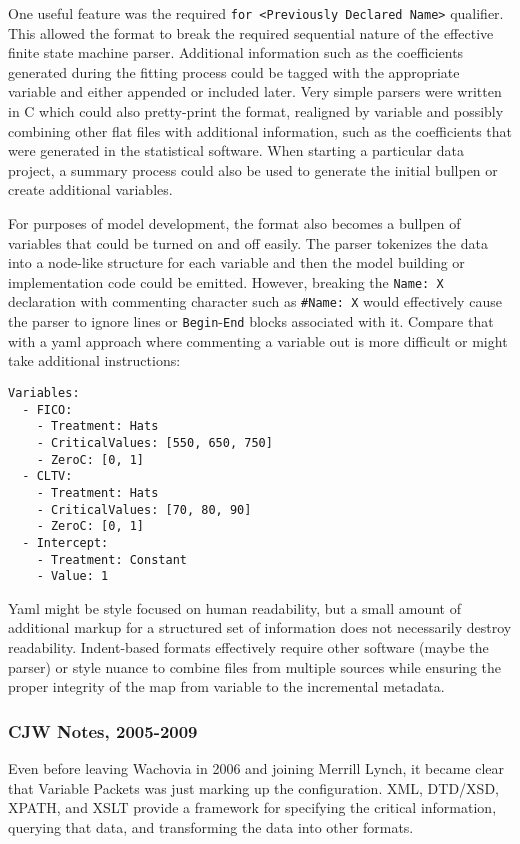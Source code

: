 \documentclass[10pt]{article}
\begin{document}
One
useful feature was the required \verb+for <Previously Declared Name>+ qualifier.  This allowed the format to break the required sequential
nature of the effective finite state machine parser. Additional information such as the coefficients generated during the fitting process could be
tagged with the appropriate variable and either appended or included later.  Very simple parsers were written in C which could also
pretty-print the format, realigned by variable and possibly combining other flat files with additional information, such as the coefficients 
that were generated in the statistical software.  When starting a particular data project, a summary process could also be used to generate
the initial bullpen or create additional variables.

For purposes of model development, the format also becomes a bullpen of variables that could be turned on and off easily.  The parser tokenizes the
data into a node-like structure for each variable and then the model building or implementation code could be emitted.  However, breaking
the \verb+Name: X+ declaration with commenting character such as \verb+#Name: X+ would effectively cause the parser to ignore lines or
{\tt Begin}-{\tt End} blocks associated with it.  Compare that with a yaml approach where commenting a variable out is more difficult or 
might take additional instructions:
\begin{Verbatim}[fontsize=\small,baselinestretch=0.75,formatcom=\color{red}]
Variables:
  - FICO:
    - Treatment: Hats
    - CriticalValues: [550, 650, 750]
    - ZeroC: [0, 1]
  - CLTV:
    - Treatment: Hats
    - CriticalValues: [70, 80, 90]
    - ZeroC: [0, 1]
  - Intercept:
    - Treatment: Constant
    - Value: 1
\end{Verbatim}
Yaml might be style focused on human readability, but a small amount of additional markup for a structured set of information 
does not necessarily destroy readability.  Indent-based formats effectively require other software (maybe the parser) or style nuance 
to combine files from multiple sources while ensuring the proper integrity of the map from variable to the incremental metadata.

\ifcommentary

\subsubsection{CJW Notes, 2005-2009}

Even before leaving Wachovia in 2006 and joining Merrill Lynch, it became clear that Variable Packets was just marking up the configuration.  
XML, DTD/XSD, XPATH, and XSLT provide a framework for specifying the critical information, querying that data, and transforming the data 
into other formats.  
\end{document}
